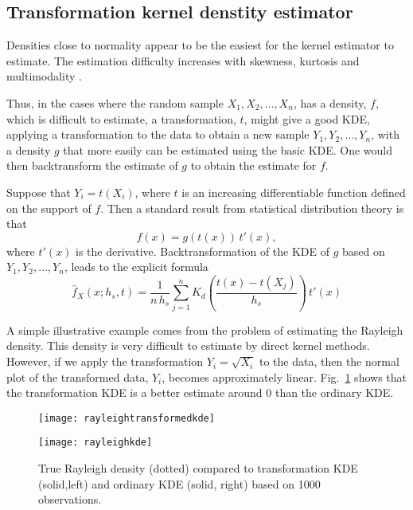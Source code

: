 \subsection{Transformation kernel denstity estimator}
Densities close to normality appear to be the easiest for
the kernel estimator to estimate. The estimation
difficulty increases with skewness, kurtosis and multimodality
\citep[][Chap. 2.9]{WandAndJones1995Kernel}.

Thus, in the cases where the random sample $X_{1},X_{2},\ldots,X_{n}$,
has a density, $f$, which is difficult to estimate, a transformation, $t$,
might give a good KDE, \ie{} applying a transformation to the data to obtain
a new sample $Y_{1},Y_{2},\ldots,Y_{n}$, with a density $g$ that
more easily can be estimated using the basic KDE. One would then
backtransform the estimate of $g$ to obtain the estimate for $f$.

Suppose that $Y_{i} = t(X_{i})$, where $t$ is an increasing
differentiable function defined on the support of $f$. Then a standard
result from statistical distribution theory is that
\begin{equation}
  \label{eq:transform}
  f(x) = g(t(x))\,t'(x),
\end{equation}
where $t'(x)$ is the derivative.
Backtransformation of the KDE of $g$ based on
$Y_{1},Y_{2},\ldots,Y_{n}$, leads to the explicit formula
\begin{equation}
  \label{eq:transformkdeformula}
  \hat{f}_{X}(x;h_{s},t) = \frac{1}{n\,h_{s}} \sum_{j=1}^{n}
K_{d}\left( \frac{t(x)-t(X_{j})}{h_{s}}\right)\,t'(x)
\end{equation}

A simple illustrative example comes from the problem of
estimating the Rayleigh density. This density is very difficult to
estimate by direct kernel methods. However, if we apply the
transformation $Y_{i} = \sqrt{X_{i}}$ to the data, then the normal plot
of the transformed data, $Y_{i}$, becomes approximately linear.
Fig.~\ref{fig:transformkde} shows that the transformation KDE is a
better estimate around 0 than the ordinary KDE.
\begin{figure}[htb]
  \begin{minipage}[b]{0.5\linewidth}%
    \centering  \texttt{[image: rayleightransformedkde]}
  \end{minipage} \hfill %
  \begin{minipage}[b]{0.5\linewidth}%
    \centering \texttt{[image: rayleighkde]}
  \end{minipage} %
  \caption[Transformation KDE compared to ordinary KDE]
        {True Rayleigh density (dotted) compared to transformation
        KDE (solid,left) and ordinary KDE (solid, right) based on 1000 observations.}
\label{fig:transformkde}
\end{figure}

